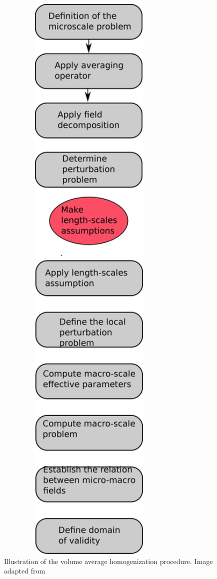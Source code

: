 \begin{figure}[h!]
	\centering
	\includegraphics[width=0.8\textwidth,height=0.8\textheight,keepaspectratio]{chapter_2/figure/schema}
	\caption{Illustration of the volume average homogenization procedure. Image adapted from \citet{davit2013homogenization}}
	\label{fig:schema_vans_homo}
\end{figure}

